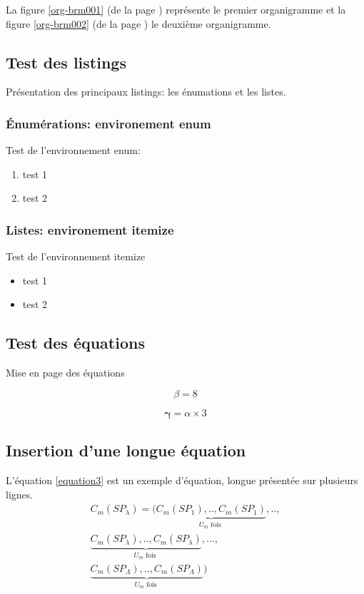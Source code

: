 La figure \ref{org-brm001} (de la page \pageref{org-brm001}) représente le premier organigramme et la figure \ref{org-brm002} (de la page \pageref{org-brm002}) le deuxième organigramme.

\subsection{Test des listings}

Présentation des principaux listings: les énumations et les listes.

\subsubsection{Énumérations: environement enum}

Test de l'environnement enum:
\begin{enumerate}
 \item test 1
 \item test 2
\end{enumerate}

\subsubsection{Listes: environement itemize}

Test de l'environnement itemize
\begin{itemize}
 \item test 1
 \item test 2
\end{itemize}

\subsection{Test des équations}

Mise en page des équations

\begin{equation}
   \beta = 8 \label{equation1}
\end{equation}

\begin{equation}
   \bm{\gamma} = \alpha \times 3
\end{equation} \label{equation2}

\subsection{Insertion d'une longue équation }

L'équation \ref{equation3} est un exemple d'équation, longue présentée sur plusieurs lignes.
    \begin{multline}
	C_m(SP_{\lambda}) = \Big(\underset{U_m \text{ fois }}{\underbrace{C_m(SP_1),..,C_m(SP_1)}}, ..,\\
	\underset{U_m \text{ fois }}{\underbrace{C_m(SP_{\lambda}),..,C_m(SP_{\lambda})}},...,\\
	\underset{U_m \text{ fois }}{\underbrace{C_m(SP_{\Lambda}),..,C_m(SP_{\Lambda})}}
	\Big) \label{equation3}
    \end{multline}


